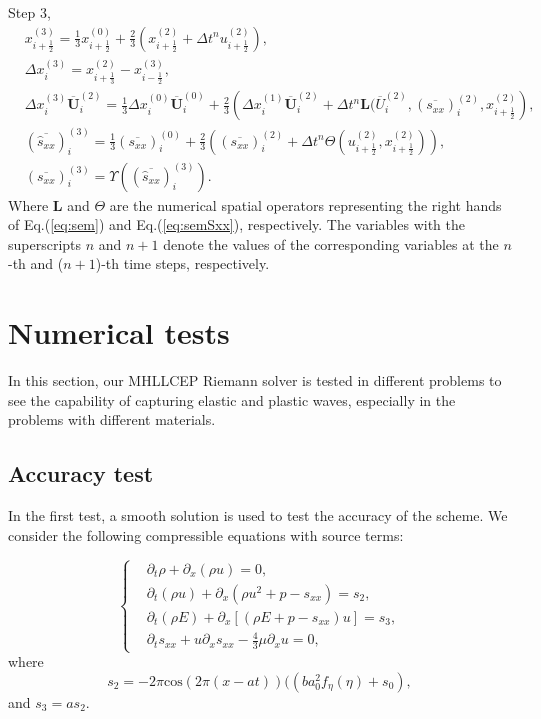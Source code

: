 \documentclass[review]{elsarticle}
\begin{document}
Step 3,
\begin{equation}
  \begin{aligned}
    & x_{i+\frac{1}{2}}^{(3)} = \frac{1}{3} x_{i+\frac{1}{2}}^{(0)}+\frac{2}{3} \left( x_{i+\frac{1}{2}}^{(2)}+\Delta t^n u_{i+\frac{1}{2}}^{(2)}\right),\\
    & \Delta x_i^{(3)} =  x_{i+\frac{1}{3}}^{(2)}- x_{i-\frac{1}{2}}^{(3)},\\
    & \Delta x_i^{(3)} \overline{\mathbf{U}}_i^{(2)}  = \frac{1}{3} \Delta x_i^{(0)} \overline{\mathbf{U}}_i^{(0)}+ \frac{2}{3} \left(  \Delta x_i^{(1)} \overline{\mathbf{U}}_i^{(2)} + \Delta t^n \mathbf{L}(\overline{U}_i^{(2)}, (\overline{s_{xx}})_i^{(2)}, x_{i+\frac{1}{2}}^{(2)} \right),\\
    & (\overline{\hat{s}_{xx}})_i^{(3)} =\frac{1}{3} (\overline{s_{xx}})_i^{(0)} + \frac{2}{3} \left(  (\overline{s_{xx}})_i^{(2)}+\Delta t^ n \varTheta (u_{i+\frac{1}{2}}^{(2)}, x_{i+\frac{1}{2}}^{(2)})\right),\\
  & (\overline{s_{xx}})_i^{(3)} = \Upsilon((\overline{\hat{s}_{xx}})_i^{(3)}).
\end{aligned}
\end{equation}
Where $\mathbf{L}$ and $\varTheta$ are the numerical spatial operators representing the right hands of Eq.(\ref{eq:sem}) and Eq.(\ref{eq:semSxx}), respectively. The variables with the superscripts $n$ and $n+1$ denote the values of the corresponding variables at the $n$-th and ($n+1$)-th time steps, respectively.

\section{Numerical tests}
In this section, our MHLLCEP Riemann solver is tested  in different problems to see the capability of  capturing elastic and plastic waves, especially in the problems  with different materials.

\subsection{Accuracy test}
In the first test, a smooth solution is used to test the accuracy of the scheme.  We consider the following compressible equations with source terms:

\begin{equation}
  \left\{
  \begin{aligned}
&	\partial_t \rho + \partial_x(\rho u) = 0, \\
&	\partial_t (\rho u) + \partial_x(\rho u^2 + p -s_{xx}) = s_2, \\
&  \partial_t (\rho E) + \partial_x[(\rho E + p -s_{xx})u] = s_3, \\
& \partial_t s_{xx} + u\partial_x s_{xx} - \frac{4}{3}\mu \partial_x u =0,
\end{aligned}
\right.
\end{equation}
where  
$$s_2 = -2\pi \text{cos}(2\pi (x-at))((ba_0^2f_\eta(\eta)+s_0),$$
  and $ s_3 = as_2 .$
\end{document}
